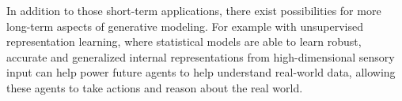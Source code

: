 In addition to those short-term applications, there exist possibilities for more long-term aspects of generative modeling.
For example with unsupervised representation learning, where statistical models are able to learn robust, accurate and generalized internal representations from high-dimensional sensory input can help power future agents to help understand real-world data, allowing these agents to take actions and reason about the real world.

\newpage





